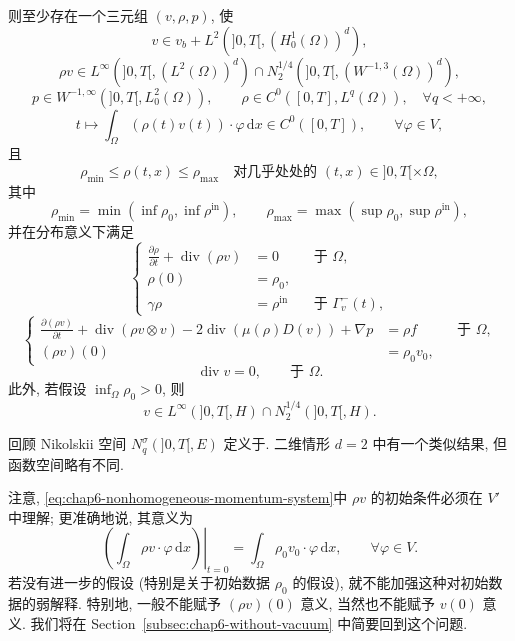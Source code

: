 \begin{sloppypar}
\begin{Theorem}[弱解的存在性]
则至少存在一个三元组 $(v,\rho,p)$, 使
\[
 v\in v_b+L^2(]0,T[,(H_0^1(\Omega))^d),
\]
\[
 \rho v\in L^\infty(]0,T[,(L^2(\Omega))^d)
 \cap N_2^{1/4}(]0,T[,(W^{-1,3}(\Omega))^d),
\]
\[
 p\in W^{-1,\infty}(]0,T[,L_0^2(\Omega)),
 \qquad
 \rho\in C^0([0,T],L^q(\Omega)),\quad\forall q<+\infty,
\]
\[
 t\longmapsto\int_\Omega(\rho(t)v(t))\cdot\varphi\,\mathrm dx
 \in C^0([0,T]),\qquad\forall\varphi\in V,
\]
且
\[
 \rho_{\min}\leq\rho(t,x)\leq\rho_{\max}
 \quad\text{对几乎处处的 }(t,x)\in]0,T[\times\Omega,
\]
其中
\[
 \rho_{\min}=\min(\inf\rho_0,\inf\rho^{\mathrm{in}}),
 \qquad
 \rho_{\max}=\max(\sup\rho_0,\sup\rho^{\mathrm{in}}),
\]
并在分布意义下满足
\begin{equation}
\left\{
\begin{aligned}
 \frac{\partial\rho}{\partial t}+\operatorname{div}(\rho v)&=0&&\text{于 }\Omega,\\
 \rho(0)&=\rho_0,\\
 \gamma\rho&=\rho^{\mathrm{in}}&&\text{于 }\Gamma_v^-(t),
\end{aligned}
\right.
\label{eq:chap6-nonhomogeneous-mass-system}
\end{equation}
\begin{equation}
\left\{
\begin{aligned}
 \frac{\partial(\rho v)}{\partial t}
 +\operatorname{div}(\rho v\otimes v)
 -2\operatorname{div}(\mu(\rho)D(v))+\nabla p&=\rho f&&\text{于 }\Omega,\\
 (\rho v)(0)&=\rho_0v_0,
\end{aligned}
\right.
\label{eq:chap6-nonhomogeneous-momentum-system}
\end{equation}
\begin{equation}
 \operatorname{div}v=0,\qquad\text{于 }\Omega.
\label{eq:chap6-nonhomogeneous-incompressibility}
\end{equation}
此外, 若假设 $\inf_\Omega\rho_0>0$, 则
\[
 v\in L^\infty(]0,T[,H)\cap N_2^{1/4}(]0,T[,H).
\]
\end{Theorem}

回顾 Nikolskii 空间 $N_q^\sigma(]0,T[,E)$ 定义于. 二维情形 $d=2$ 中有一个类似结果, 但函数空间略有不同.

注意, \eqref{eq:chap6-nonhomogeneous-momentum-system}中 $\rho v$ 的初始条件必须在 $V'$ 中理解; 更准确地说, 其意义为
\[
 \left.\left(\int_\Omega\rho v\cdot\varphi\,\mathrm dx\right)\right|_{t=0}
 =\int_\Omega\rho_0v_0\cdot\varphi\,\mathrm dx,
 \qquad\forall\varphi\in V.
\]
若没有进一步的假设 (特别是关于初始数据 $\rho_0$ 的假设), 就不能加强这种对初始数据的弱解释. 特别地, 一般不能赋予 $(\rho v)(0)$ 意义, 当然也不能赋予 $v(0)$ 意义. 我们将在 Section~\ref{subsec:chap6-without-vacuum} 中简要回到这个问题.


\end{sloppypar}
